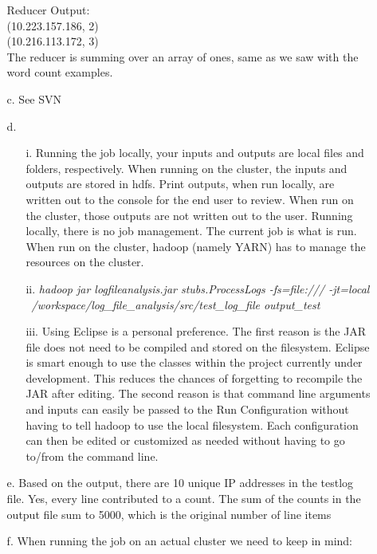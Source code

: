 \documentclass{article}
\begin{document}
\begin{itemize}
\begin{itemize}
	Reducer Output:\\
		(10.223.157.186, 2)\\
		(10.216.113.172, 3)\\

	The reducer is summing over an array of ones, same as we saw with the word count examples.
	
	\item[c.] See SVN
	\item[d.]
		\begin{itemize}
		\item[i.] Running the job locally, your inputs and outputs are local files and folders, respectively. When running on the cluster, the inputs and outputs are stored in hdfs. Print outputs, when run locally, are written out to the console for the end user to review. When run on the cluster, those outputs are not written out to the user. Running locally, there is no job management. The current job is what is run. When run on the cluster, hadoop (namely YARN) has to manage the resources on the cluster.
		\item[ii.]
		\textit{hadoop jar logfileanalysis.jar stubs.ProcessLogs -fs=file:/// -jt=local ~/workspace/log\_file\_analysis/src/test\_log\_file output\_test}
		\item[iii.] Using Eclipse is a personal preference. The first reason is the JAR file does not need to be compiled and stored on the filesystem. Eclipse is smart enough to use the classes within the project currently under development. This reduces the chances of forgetting to recompile the JAR after editing. The second reason is that command line arguments and inputs can easily be passed to the Run Configuration without having to tell hadoop to use the local filesystem. Each configuration can then be edited or customized as needed without having to go to/from the command line.
		\end{itemize}
	\item[e.]
	Based on the output, there are 10 unique IP addresses in the testlog file. Yes, every line contributed to a count. The sum of the counts in the output file sum to 5000, which is the original number of line items
	\item[f.]
	When running the job on an actual cluster we need to keep in mind:
		\begin{itemize}

\end{itemize}
\end{itemize}
\end{itemize}
\end{document}
